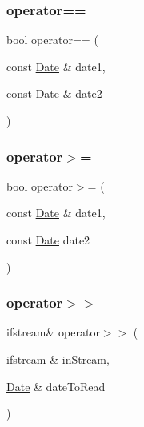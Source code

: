\hypertarget{class_date_a588c6068972f9e69bc50292405c1fac7}{}\label{class_date_a588c6068972f9e69bc50292405c1fac7} 
\subsubsection{\texorpdfstring{operator==}{operator==}}
{\footnotesize\ttfamily bool operator== (\begin{DoxyParamCaption}\item[{const \hyperlink{class_date}{Date} \&}]{date1,  }\item[{const \hyperlink{class_date}{Date} \&}]{date2 }\end{DoxyParamCaption})\hspace{0.3cm}{\ttfamily [friend]}}

\hypertarget{class_date_ad9736995fa90a35631dc5f220e33e4b2}{}\label{class_date_ad9736995fa90a35631dc5f220e33e4b2} 
\subsubsection{\texorpdfstring{operator$>$=}{operator>=}}
{\footnotesize\ttfamily bool operator$>$= (\begin{DoxyParamCaption}\item[{const \hyperlink{class_date}{Date} \&}]{date1,  }\item[{const \hyperlink{class_date}{Date}}]{date2 }\end{DoxyParamCaption})\hspace{0.3cm}{\ttfamily [friend]}}

\hypertarget{class_date_ab895bef0d8545ab4875f6bfc4a7fd4f7}{}\label{class_date_ab895bef0d8545ab4875f6bfc4a7fd4f7} 
\subsubsection{\texorpdfstring{operator$>$$>$}{operator>>}}
{\footnotesize\ttfamily ifstream\& operator$>$$>$ (\begin{DoxyParamCaption}\item[{ifstream \&}]{in\+Stream,  }\item[{\hyperlink{class_date}{Date} \&}]{date\+To\+Read }\end{DoxyParamCaption})\hspace{0.3cm}{\ttfamily [friend]}}




